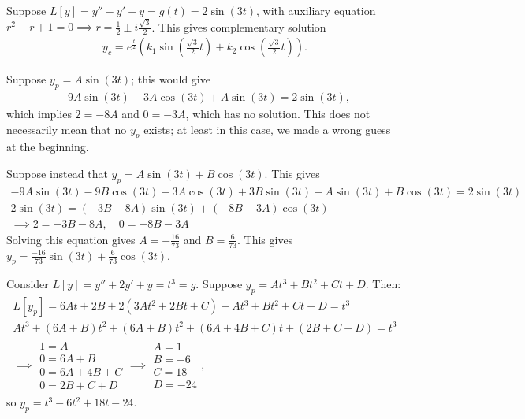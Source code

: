 \begin{example}
    Suppose $L[y] = y''-y'+y=g(t) = 2 \sin (3 t)$, with auxiliary equation $r^2 - r + 1 = 0 \implies r = \frac{1}{2} \pm i \frac{\sqrt{3}}{2}$. This gives complementary solution \begin{align*}
        y_c = e^{\frac{t}{2}}\left(k_1 \sin (\frac{\sqrt{3}}{2}t) + k_2 \cos (\frac{\sqrt{3}}{2}t)\right).
    \end{align*}

    Suppose $y_p = A \sin (3 t)$; this would give \begin{align*}
        -9A \sin (3t) - 3A \cos (3t)  + A \sin (3t)= 2\sin (3t),
    \end{align*}
    which implies $2 = - 8 A$ and $0 = -3 A$, which has no solution. This does not necessarily mean that no $y_p$ exists; at least in this case, we made a wrong guess at the beginning.

    Suppose instead that $y_p = A \sin (3t) + B \cos (3t)$. This gives \begin{align*}
        -9A \sin (3t) - 9B \cos (3t) - 3A \cos (3t) + 3B \sin (3t) + A \sin (3t) + B \cos (3t) = 2 \sin (3t)\\
        2\sin(3t) = (-3B - 8A)\sin(3t) + (-8B-3A)\cos (3t)\\
        \implies 2 = -3B - 8A, \quad 0 = -8B - 3A
    \end{align*}
    Solving this equation gives $A = -\frac{16}{73}$ and $B = \frac{6}{73}$. This gives $y_p = \frac{-16}{73} \sin (3t) + \frac{6}{73} \cos (3t)$.
\end{example}

\begin{example}
    Consider $L[y] = y'' + 2y'+y = t^3 = g$. Suppose $y_p = At^3 + Bt^2 + Ct+D$. Then:
    \begin{align*}
        L[y_p] = 6At + 2B + 2(3At^2 +2Bt+C) + At^3+Bt^2+Ct+D = t^3\\
        At^3 + (6A + B)t^2 + (6A + B)t^2 + (6A + 4B+ C)t + (2B+C+D) = t^3\\
        \implies \begin{matrix}
            1 = A\\
            0 = 6A + B\\
            0 = 6A + 4B + C\\
            0 = 2B + C + D
        \end{matrix} \implies \begin{matrix}
            A = 1\\
            B = -6\\
            C = 18\\
            D = -24
        \end{matrix},
    \end{align*}
    so $y_p = t^3 - 6t^2 + 18t - 24$.
\end{example}

